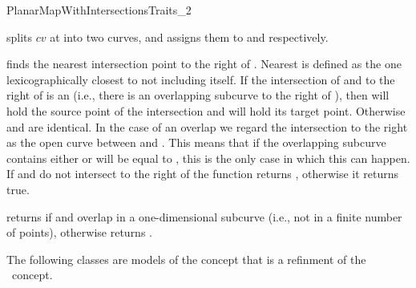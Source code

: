 \begin{ccRefConcept}{PlanarMapWithIntersectionsTraits_2}


  {splits $cv$ at  into two curves, and assigns them to
   and  respectively.
  }

{finds the
nearest intersection point to the right of . Nearest is defined as the
one lexicographically closest to  not including  itself.
If the intersection of  and  to the
right of  is an  (i.e., there is an overlapping subcurve
to the right of ),
then  will hold the source point of the intersection and
 will hold its target point. Otherwise  and  are
identical. In the case of an overlap we regard the intersection
to the right as the open curve between  and . This means that
if the overlapping subcurve contains  either  or  will
be equal to , this is the only case in which this can happen.
If  and  do not intersect to the right of 
the function returns , otherwise it returns true.
}


{returns  if  and  overlap
in a one-dimensional subcurve (i.e., not in a finite number
of points), otherwise returns
.}

\ccHasModels
The following classes are models of the 
 concept that is a refinment of the \ccRefName\
concept. 


\end{ccRefConcept}
